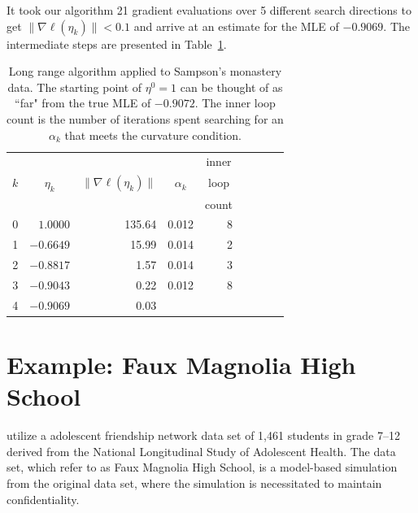 It took our algorithm 21 gradient evaluations over 5 different search directions to get $\lVert \nabla \ell( \eta_k ) \rVert < 0.1$ and arrive at an estimate for the MLE of  $-0.9069$.  The intermediate steps are presented in Table~\ref{T:Sampson redo}.  

\begin{table} \label{T:Sampson redo}
\caption[Long range algorithm applied to Sampson's monastery data]{
Long range algorithm applied to Sampson's 
monastery data.  The starting point of $\eta^0 = 1$ can be thought of as ``far" from the
true MLE of $-0.9072$.  The inner loop count is the number of iterations spent searching for an $\alpha_k$ that meets the curvature condition.  
}
\begin{center}
\begin{tabular}{rrrrrrlrr}
  \hline
    &  &  &  & \multicolumn{1}{c}{inner}\\
  \multicolumn{1}{c}{$k$} & 
  \multicolumn{1}{c}{$\eta_k$} &
  \multicolumn{1}{c}{$\lVert \nabla \ell(\eta_k) \rVert$} &
  \multicolumn{1}{c}{$\alpha_k$} &
  \multicolumn{1}{c}{loop }\\
    &  &  &  & \multicolumn{1}{c}{count}\\
  \hline
   0 &  $1.0000$ & 135.64 &  0.012 & 8\\
   1 & $-0.6649$ & 15.99  &  0.014 & 2 \\
   2 & $-0.8817$ & 1.57   &  0.014 & 3 \\
   3 & $-0.9043$ & 0.22   &  0.012 & 8 \\
   4 & $-0.9069$ & 0.03   &  &  \\
   \hline
\end{tabular} \label{T:Sampson redo}
\end{center}
\end{table}


\section{Example: Faux Magnolia High School} \label{S:Example:FauxMagnolia}
\citet{advancesp*,statnet-tutorial} utilize a adolescent friendship network data set 
of 1,461 students in grade 7--12 derived from the National Longitudinal Study of 
Adolescent Health.  The data set, which \citeauthor{statnet-tutorial} refer to as Faux 
Magnolia High School, is a model-based simulation from the original data set, where 
the simulation is necessitated to maintain confidentiality.

